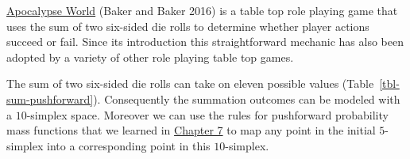 \documentclass[
  letterpaper,
  DIV=11,
  numbers=noendperiod]{scrartcl}
\begin{document}
\href{http://apocalypse-world.com}{Apocalypse World} (Baker and Baker
2016) is a table top role playing game that uses the sum of two
six-sided die rolls to determine whether player actions succeed or fail.
Since its introduction this straightforward mechanic has also been
adopted by a variety of other role playing table top games.

The sum of two six-sided die rolls can take on eleven possible values
(Table~\ref{tbl-sum-pushforward}). Consequently the summation outcomes
can be modeled with a \(10\)-simplex space. Moreover we can use the
rules for pushforward probability mass functions that we learned in
\href{https://betanalpha.github.io/assets/chapters_html/transforming_probability_spaces.html\#transforming-probability-mass-functions}{Chapter
7} to map any point in the initial \(5\)-simplex into a corresponding
point in this \(10\)-simplex.
\end{document}
